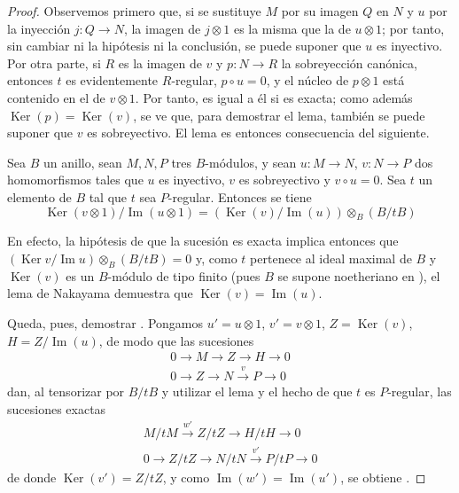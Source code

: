 \begin{proof}
Observemos primero que, si se sustituye $M$ por su imagen $Q$ en $N$ y $u$ por la inyección $j:Q\to N$, la imagen de $j\otimes1$ es la misma que la de $u\otimes1$; por tanto, sin cambiar ni la hipótesis ni la conclusión, se puede suponer que $u$ es inyectivo.
Por otra parte, si $R$ es la imagen de $v$ y $p:N\to R$ la sobreyección canónica, entonces $t$ es evidentemente $R$-regular, $p\circ u=0$, y el núcleo de $p\otimes1$ está contenido en el de $v\otimes1$.
Por tanto, es igual a él si  es exacta; como además $\operatorname{Ker}(p)
=\operatorname{Ker}(v)$,
se ve que, para demostrar el lema, también se puede suponer que $v$ es sobreyectivo.
El lema es entonces consecuencia del siguiente.

\begin{lemma}[12.3.3.3]
\label{IV.12.3.3.3}
Sea $B$ un anillo, sean $M,N,P$ tres $B$-módulos, y sean
$u:M\to N$, $v:N\to P$ dos homomorfismos tales que $u$ es inyectivo, $v$ es sobreyectivo y $v\circ u=0$.
Sea $t$ un elemento de $B$ tal que $t$ sea $P$-regular.
Entonces se tiene
\begin{equation}
  \tag{12.3.3.4}
  \label{IV.12.3.3.4-fr}
  \operatorname{Ker}(v\otimes1)/\operatorname{Im}(u\otimes1)
  =(\operatorname{Ker}(v)/\operatorname{Im}(u))\otimes_B(B/tB)
\end{equation}
\end{lemma}

En efecto, la hipótesis de que la sucesión  es exacta implica entonces que $(\operatorname{Ker}v/\operatorname{Im}u)\otimes_B(B/tB)=0$ y, como $t$ pertenece al ideal maximal de $B$ y $\operatorname{Ker}(v)$ es un $B$-módulo de tipo finito (pues $B$ se supone noetheriano en ), el lema de Nakayama demuestra que $\operatorname{Ker}(v)=\operatorname{Im}(u)$.

Queda, pues, demostrar .
Pongamos $u'=u\otimes1$, $v'=v\otimes1$, $Z=\operatorname{Ker}(v)$, $H=Z/\operatorname{Im}(u)$, de modo que las sucesiones
\begin{gather*}
  0\to M\to Z\to H\to0\\
  0\to Z\to N\xrightarrow{v}P\to0
\end{gather*}
dan, al tensorizar por $B/tB$ y utilizar el lema  y el hecho de que $t$ es $P$-regular, las sucesiones exactas
\begin{gather*}
  M/tM\xrightarrow{w'}Z/tZ\to H/tH\to0\\
  0\to Z/tZ\to N/tN\xrightarrow{v'}P/tP\to0
\end{gather*}
de donde $\operatorname{Ker}(v')=Z/tZ$, y como $\operatorname{Im}(w')=\operatorname{Im}(u')$, se obtiene .


\end{proof}
